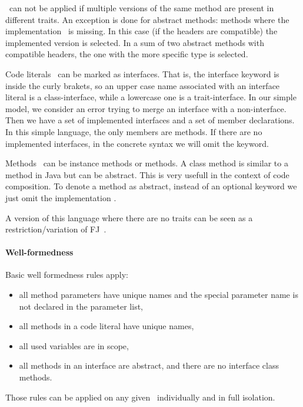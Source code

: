 \use\ can not be applied if multiple versions of the same method are
present in different traits.  An exception is done for abstract methods:
methods where the implementation \me\ is missing. In this case (if the
headers are compatible) the implemented version is selected.  In a sum
of two abstract methods with compatible headers, the one with the more
specific type is selected.

Code literals \mL\ can be marked as interfaces. 
That is, the interface keyword is inside the curly brakets, so an upper case name associated with an interface literal is a class-interface, while a lowercase one is a trait-interface.
In our simple model, we consider an error trying to merge an interface with a non-interface.
 Then we have a set of implemented interfaces and a set of member
  declarations. In this simple language, the only members are methods.
If there are no implemented interfaces, in the concrete syntax we will omit the \Q@implements@ keyword.

Methods \mMD~can be instance methods or \Q@class@ methods. A class method is similar to a \Q@static@ method in Java but can be abstract. This is very usefull in the context of code composition.
To denote a method as abstract, instead of an optional keyword we just omit the implementation \me.

A version of this language where there are no traits can be seen 
as a restriction/variation of FJ~\cite{igarashi2001featherweight}.

\paragraph{Well-formedness}
Basic well formedness rules apply:
\begin{itemize}
\item all method parameters have unique names and the special parameter name \Q@this@ is not declared
 in the parameter list,
\item all methods in a code literal have unique names,
\item all used variables are in scope,
\item all methods in an interface are abstract, and there are no interface class methods.
\end{itemize}
Those rules can be applied on any given \mL~individually and in full isolation.

